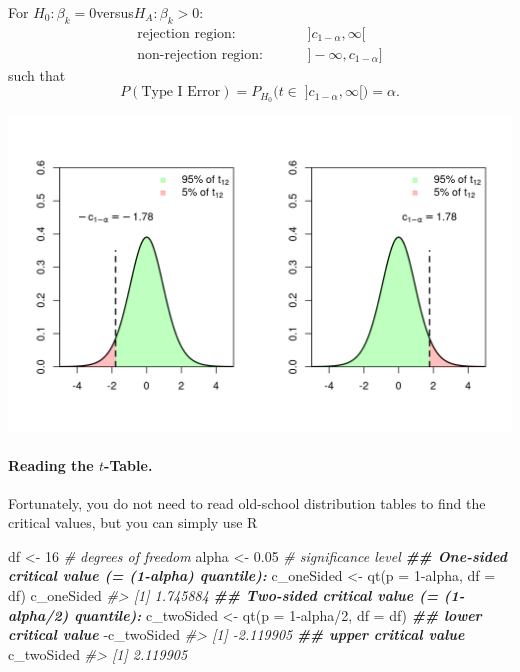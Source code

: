 \documentclass[
  14pt,
]{memoir}
\newenvironment{Shaded}{\begin{snugshade}}{\end{snugshade}}
\newcommand{\AttributeTok}[1]{\textcolor[rgb]{0.77,0.63,0.00}{#1}}
\newcommand{\CommentTok}[1]{\textcolor[rgb]{0.56,0.35,0.01}{\textit{#1}}}
\newcommand{\DecValTok}[1]{\textcolor[rgb]{0.00,0.00,0.81}{#1}}
\newcommand{\DocumentationTok}[1]{\textcolor[rgb]{0.56,0.35,0.01}{\textbf{\textit{#1}}}}
\newcommand{\FloatTok}[1]{\textcolor[rgb]{0.00,0.00,0.81}{#1}}
\newcommand{\FunctionTok}[1]{\textcolor[rgb]{0.00,0.00,0.00}{#1}}
\newcommand{\NormalTok}[1]{#1}
\newcommand{\OtherTok}[1]{\textcolor[rgb]{0.56,0.35,0.01}{#1}}
\newcommand{\SpecialCharTok}[1]{\textcolor[rgb]{0.00,0.00,0.00}{#1}}
\begin{document}
\bigskip

\noindent For \(H_0: \beta_k=0\)\quad versus\quad\(H_A: \beta_k > 0\):
\begin{align*}
\text{rejection region:}&\hspace{1cm}]c_{1-\alpha}, \infty[\\
\text{non-rejection region:}&\hspace{1cm}]-\infty,c_{1-\alpha}]
\end{align*}
such that
\[
P(\text{Type I Error})=P_{H_0}\Big(t\in\;]c_{1-\alpha}, \infty[\Big)=\alpha.
\]

\begin{center}\includegraphics[width=1\textwidth]{figure/minimal-unnamed-chunk-68-1} \end{center}

\paragraph*{Reading the $t$-Table.}

Fortunately, you do not need to read old-school distribution tables to find the critical values, but you can simply use \textsf{R}

\begin{Shaded}
\begin{Highlighting}[]
\NormalTok{df    }\OtherTok{\textless{}{-}} \DecValTok{16}   \CommentTok{\# degrees of freedom }
\NormalTok{alpha }\OtherTok{\textless{}{-}} \FloatTok{0.05} \CommentTok{\# significance level}
\DocumentationTok{\#\# One{-}sided critical value (= (1{-}alpha) quantile):}
\NormalTok{c\_oneSided }\OtherTok{\textless{}{-}} \FunctionTok{qt}\NormalTok{(}\AttributeTok{p =} \DecValTok{1}\SpecialCharTok{{-}}\NormalTok{alpha, }\AttributeTok{df =}\NormalTok{ df)}
\NormalTok{c\_oneSided}
\CommentTok{\#\textgreater{} [1] 1.745884}
\DocumentationTok{\#\# Two{-}sided critical value (= (1{-}alpha/2) quantile):}
\NormalTok{c\_twoSided }\OtherTok{\textless{}{-}} \FunctionTok{qt}\NormalTok{(}\AttributeTok{p =} \DecValTok{1}\SpecialCharTok{{-}}\NormalTok{alpha}\SpecialCharTok{/}\DecValTok{2}\NormalTok{, }\AttributeTok{df =}\NormalTok{ df)}
\DocumentationTok{\#\# lower critical value}
\SpecialCharTok{{-}}\NormalTok{c\_twoSided}
\CommentTok{\#\textgreater{} [1] {-}2.119905}
\DocumentationTok{\#\# upper critical value}
\NormalTok{c\_twoSided}
\CommentTok{\#\textgreater{} [1] 2.119905}
\end{Highlighting}
\end{Shaded}
\end{document}

